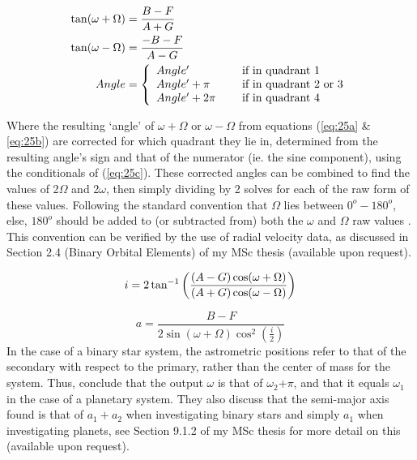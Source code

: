 \documentclass[12pt,preprint]{aastex}
\begin{document}
\begin{subequations}
\begin{align}\label{eq:25a}
\tan(\omega+\Omega)& = \frac{B-F}{A+G} \\
\label{eq:25b}
\tan(\omega-\Omega)& = \frac{-B-F}{A-G}\\
\label{eq:25c}
Angle& = \left\{ \begin{array}{l l l} Angle^{\prime}& \quad \text{ if in quadrant 1}\\ Angle^{\prime} + \pi& \quad \text{ if in quadrant 2 or 3}\\ Angle^{\prime} + 2\pi& \quad \text{ if in quadrant 4}  \end{array} \right.
\end{align}
\end{subequations}

Where the resulting `angle' of $\omega+\Omega$ or $ \omega-\Omega$ from equations (\ref{eq:25a} \& \ref{eq:25b}) are corrected for which quadrant they lie in, determined from the resulting angle's sign and that of the numerator (ie. the sine component), using the conditionals of (\ref{eq:25c}).  These corrected angles can be combined to find the values of 2$\Omega$ and 2$\omega$, then simply dividing by 2 solves for each of the raw form of these values.  Following the standard convention that $\Omega$ lies between $0^{o}-180^{o}$, else, $180^{o}$ should be added to (or subtracted from) both the $\omega$ and $\Omega$ raw values \citep{aitken}.  This convention can be verified by the use of radial velocity data, as discussed in Section 2.4 (Binary Orbital Elements) of my MSc thesis (available upon request).

\begin{equation}\label{eq:26}
i = 2\tan^{-1}\bigg(\frac{(A-G)\cos(\omega+\Omega)}{(A+G)\cos(\omega-\Omega)}  \bigg)\\
\end{equation}

\begin{equation}\label{eq:27}
a = \frac{B-F}{2\sin(\omega+\Omega)\cos^2(\frac{i}{2})}
\end{equation}
In the case of a binary star system, the astrometric positions refer to that of the secondary with respect to the primary, rather than the center of mass for the system.  Thus, \citet{Shulze-Hartung} conclude that the output $\omega$ is that of $\omega_2$+$\pi$, and that it equals $\omega_1$ in the case of a planetary system.  They also discuss that the semi-major axis found is that of $a_1+a_2$ when investigating binary stars and simply $a_1$ when investigating planets, see Section 9.1.2 of my MSc thesis for more detail on this (available upon request).
\end{document}
